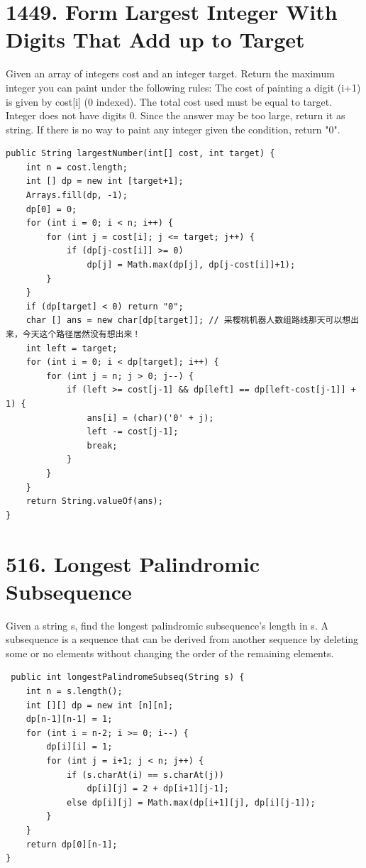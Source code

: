 \documentclass[9pt, b5paaper]{book}
\begin{document}
\section{1449. Form Largest Integer With Digits That Add up to Target}
\label{sec-2-28}
Given an array of integers cost and an integer target. Return the maximum integer you can paint under the following rules:
The cost of painting a digit (i+1) is given by cost[i] (0 indexed).
The total cost used must be equal to target.
Integer does not have digits 0.
Since the answer may be too large, return it as string.
If there is no way to paint any integer given the condition, return "0".
\begin{verbatim}
public String largestNumber(int[] cost, int target) { 
    int n = cost.length;
    int [] dp = new int [target+1];
    Arrays.fill(dp, -1);
    dp[0] = 0;
    for (int i = 0; i < n; i++) {
        for (int j = cost[i]; j <= target; j++) {
            if (dp[j-cost[i]] >= 0)
                dp[j] = Math.max(dp[j], dp[j-cost[i]]+1);
        }
    }
    if (dp[target] < 0) return "0";
    char [] ans = new char[dp[target]]; // 采樱桃机器人数组路线那天可以想出来，今天这个路径居然没有想出来！
    int left = target;
    for (int i = 0; i < dp[target]; i++) {
        for (int j = n; j > 0; j--) {
            if (left >= cost[j-1] && dp[left] == dp[left-cost[j-1]] + 1) {
                ans[i] = (char)('0' + j);
                left -= cost[j-1];
                break;
            }
        }
    }
    return String.valueOf(ans);
}
\end{verbatim}

\section{516. Longest Palindromic Subsequence}
\label{sec-2-29}
Given a string s, find the longest palindromic subsequence's length in s.
A subsequence is a sequence that can be derived from another sequence by deleting some or no elements without changing the order of the remaining elements.
\begin{verbatim}
 public int longestPalindromeSubseq(String s) {
    int n = s.length();
    int [][] dp = new int [n][n];
    dp[n-1][n-1] = 1;
    for (int i = n-2; i >= 0; i--) {
        dp[i][i] = 1;
        for (int j = i+1; j < n; j++) {
            if (s.charAt(i) == s.charAt(j))
                dp[i][j] = 2 + dp[i+1][j-1];
            else dp[i][j] = Math.max(dp[i+1][j], dp[i][j-1]);
        }
    }
    return dp[0][n-1];
}
\end{verbatim}
\end{document}
